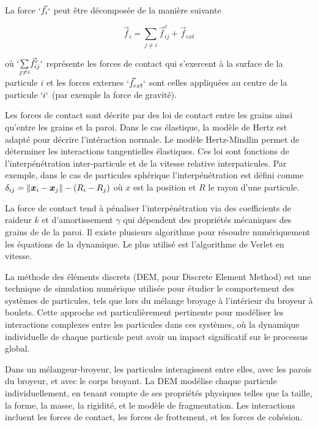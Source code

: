La force $`\vec{f}_{i}`$ peut être décomposée de la manière suivante

\begin{equation*}
    \vec{f}_{i}=\underset{{\scriptstyle j\neq i}}{\sum}\vec{f}^{c}_{ij}+\vec{f}_{ext}
\end{equation*}

où $`\underset{{\scriptstyle j\neq i}}{\sum}\vec{f}^{c}_{ij}`$ représente les forces de contact qui s'exercent à la surface de la particule $i$ et les forces externes $`\vec{f}_{ext}`$ sont celles appliquées au centre de la particule $`i`$ (par exemple la force de gravité).

Les forces de contact sont décrite par des loi de contact entre les grains ainsi qu'entre les grains et la paroi. Dans le cas élastique, la modèle de Hertz est adapté pour décrire l'intéraction normale. Le modèle Hertz-Mindlin permet de déterminer les interactions tangentielles élastiques. Ces loi sont fonctions de l'interpénétration inter-particule et de la vitesse relative interpaticules. Par exemple, dans le cas de particules sphérique l'interpénétration est défini comme $\delta_{ij} = \left\lVert \bm x_i - \bm x_j \right\rVert - (R_i - R_j)$ où $x$  est la position et $R$ le rayon d'une particule.

La force de contact tend à pénaliser l'interpénétration via des coefficients de raideur $k$ et d'amortissement $\gamma$ qui dépendent des propriétés mécaniques des grains de de la paroi. Il existe plusieurs algorithme pour résoudre numériquement les équations de la dynamique. Le plus utilisé est l'algorithme de Verlet en vitesse.


La méthode des éléments discrets (DEM, pour Discrete Element Method) est une technique de simulation numérique utilisée pour étudier le comportement des systèmes de particules, tels que lors du mélange broyage à l'intérieur du broyeur à boulets. Cette approche est particulièrement pertinente pour modéliser les interactions complexes entre les particules dans ces systèmes, où la dynamique individuelle de chaque particule peut avoir un impact significatif sur le processus global.

Dans un mélangeur-broyeur, les particules interagissent entre elles, avec les parois du broyeur, et avec le corps broyant. La DEM modélise chaque particule individuellement, en tenant compte de ses propriétés physiques telles que la taille, la forme, la masse, la rigidité, et le modèle de fragmentation. Les interactions incluent les forces de contact, les forces de frottement, et les forces de cohésion.

